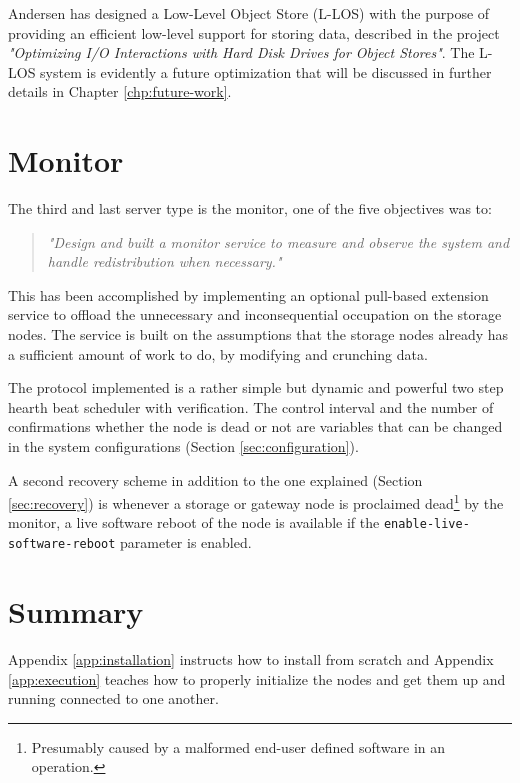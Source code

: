 Andersen has designed a Low-Level Object Store (L-LOS) with the purpose of providing an efficient low-level support for storing data, described in the project \textit{"Optimizing I/O Interactions with Hard Disk Drives for Object Stores"}\cite{andersen2016}. The L-LOS system is evidently a future optimization that will be discussed in further details in Chapter \ref{chp:future-work}. 

\section{Monitor} \label{sec:monitor}
The third and last server type is the monitor, one of the five objectives was to:

\begin{quotation}
	\textit{"Design and built a monitor service to measure and observe the system and handle redistribution when necessary."}
\end{quotation}

This has been accomplished by implementing an optional pull-based extension service to offload the unnecessary and inconsequential 	occupation on the storage nodes. The service is built on the assumptions that the storage nodes already has a sufficient amount of work to do, by modifying and crunching data.
\newline

The protocol implemented is a rather simple but dynamic and powerful two step hearth beat scheduler with verification. The control interval and the number of confirmations whether the node is dead or not are variables that can be changed in the system configurations (Section \ref{sec:configuration}). 
\newpage

A second recovery scheme in addition to the one explained (Section \ref{sec:recovery}) is whenever a storage or gateway node is proclaimed dead\footnote{Presumably caused by a malformed end-user defined software in an operation.} by the monitor, a live software reboot of the node is available if the \texttt{enable-live-software-reboot} parameter is enabled.

\section{Summary}
Appendix \ref{app:installation} instructs how to install \CodeName from scratch and Appendix \ref{app:execution} teaches how to properly initialize the nodes and get them up and running connected to one another.